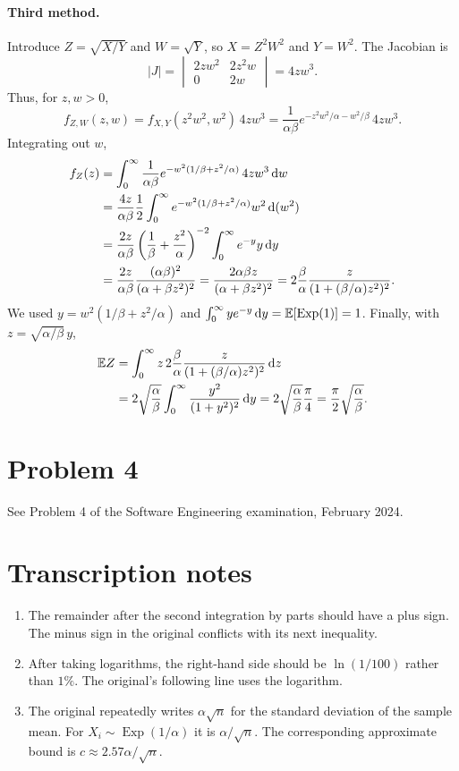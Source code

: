 \documentclass[11pt,a4paper]{article}
\begin{document}
\paragraph{Third method.} Introduce $Z=\sqrt{X/Y}$ and $W=\sqrt Y$, so $X=Z^2W^2$ and $Y=W^2$. The Jacobian is
\[
|J|=\begin{vmatrix}2zw^2&2z^2w\\0&2w\end{vmatrix}=4zw^3.
\]
Thus, for $z,w>0$,
\[
f_{Z,W}(z,w)=f_{X,Y}(z^2w^2,w^2)\,4zw^3
=\frac1{\alpha\beta}e^{-z^2w^2/\alpha-w^2/\beta}\,4zw^3.
\]
Integrating out $w$,
\begin{align*}
f_Z(z)&=\int_0^\infty\frac1{\alpha\beta}
e^{-w^2(1/\beta+z^2/\alpha)}\,4zw^3\, \mathrm{d} w\\
&=\frac{4z}{\alpha\beta}\frac12\int_0^\infty
e^{-w^2(1/\beta+z^2/\alpha)}w^2\, \mathrm{d}(w^2)\\
&=\frac{2z}{\alpha\beta}\left(\frac1\beta+\frac{z^2}\alpha\right)^{-2}
\int_0^\infty e^{-y}y\, \mathrm{d} y\\
&=\frac{2z}{\alpha\beta}\frac{(\alpha\beta)^2}{(\alpha+\beta z^2)^2}
=\frac{2\alpha\beta z}{(\alpha+\beta z^2)^2}
=2\frac\beta\alpha\frac z{(1+(\beta/\alpha)z^2)^2}.
\end{align*}
We used $y=w^2(1/\beta+z^2/\alpha)$ and $\int_0^\infty ye^{-y}\, \mathrm{d} y=\mathbb {E}[\operatorname{Exp}(1)]=1$.
Finally, with $z=\sqrt{\alpha/\beta}\,y$,
\begin{align*}
\mathbb {E} Z&=\int_0^\infty z\,2\frac\beta\alpha\frac z{(1+(\beta/\alpha)z^2)^2}\, \mathrm{d} z\\
&=2\sqrt{\frac\alpha\beta}\int_0^\infty\frac{y^2}{(1+y^2)^2}\, \mathrm{d} y
=2\sqrt{\frac\alpha\beta}\frac\pi4
=\frac\pi2\sqrt{\frac\alpha\beta}.
\end{align*}

\section*{Problem 4}
See Problem 4 of the Software Engineering examination, February 2024.

\section*{Transcription notes}
\begin{enumerate}
\item The remainder after the second integration by parts should have a plus sign. The minus sign in the original conflicts with its next inequality.
\item After taking logarithms, the right-hand side should be $\ln(1/100)$ rather than $1\%$. The original's following line uses the logarithm.
\item The original repeatedly writes $\alpha\sqrt n$ for the standard deviation of the sample mean. For $X_i\sim\operatorname{Exp}(1/\alpha)$ it is $\alpha/\sqrt n$. The corresponding approximate bound is $c\approx2.57\alpha/\sqrt n$.
\end{enumerate}
\end{document}
